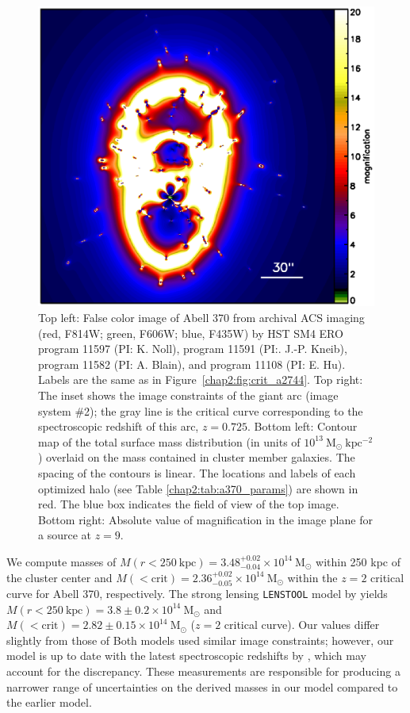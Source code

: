 \begin{figure}[h]
\includegraphics[height=0.28\textheight]{Chap2/c2f6c.eps}
\caption[Abell 370 image constraints and critical curves]{Top left: False color image of Abell 370 from archival ACS imaging (red, F814W; green, F606W; blue, F435W) by HST SM4 ERO program 11597 (PI: K. Noll), program 11591 (PI:. J.-P. Kneib), program 11582 (PI: A. Blain), and program 11108 (PI: E. Hu).  Labels are the same as in Figure~\ref{chap2:fig:crit_a2744}. Top right: The inset shows the image constraints of the giant arc (image system \#2); the gray line is the critical curve corresponding to the spectroscopic redshift of this arc, $z=0.725$. Bottom left: Contour map of the total surface mass distribution (in units of $10^{13}\ \mathrm{M_\odot \ kpc^{-2}}$) overlaid on the mass contained in cluster member galaxies. The spacing of the contours is linear. The locations and labels of each optimized halo (see Table \ref{chap2:tab:a370_params}) are shown in red. The blue box indicates the field of view of the top image. Bottom right: Absolute value of magnification in the image plane for a source at $z=9$.}
\label{chap2:fig:crit_a370}
\end{figure}

We compute masses of $M(r<250\ \mathrm{kpc})=3.48^{+0.02}_{-0.04}\times10^{14}\ \mathrm{M_\odot}$ within 250 kpc of the cluster center and $M(<\mathrm{crit})=2.36^{+0.02}_{-0.05}\times10^{14}\ \mathrm{M_\odot}$ within the $z=2$ critical curve for Abell 370, respectively. The strong lensing \texttt{LENSTOOL} model by \citet{Richard:2010wd} yields $M(r<250\ \mathrm{kpc})=3.8\pm0.2\times10^{14}\ \mathrm{M_\odot}$ and $M(<\mathrm{crit})=2.82\pm0.15\times10^{14}\ \mathrm{M_\odot}$  ($z=2$ critical curve). Our values differ slightly from those of \citeauthor{Richard:2010wd} Both models used similar image constraints; however, our model is up to date with the latest spectroscopic redshifts by  \citet{Richard:2014gf}, which may account for the discrepancy. These measurements are responsible for producing a narrower range of uncertainties on the derived masses in our model compared to the earlier \citeauthor{Richard:2010wd} model.


